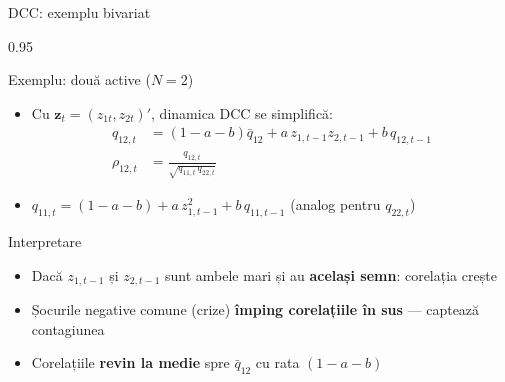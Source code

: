 \documentclass[9pt, aspectratio=169, t]{beamer}
\begin{document}
\begin{frame}{DCC: exemplu bivariat}
    \begin{cminipage}{0.95\textwidth}
    {\footnotesize
    \begin{exampleblock}{Exemplu: două active ($N=2$)}
        \begin{itemize}\setlength{\itemsep}{0pt}
            \item Cu $\mathbf{z}_t = (z_{1t}, z_{2t})'$, dinamica DCC se simplifică:
            \begin{align}
                q_{12,t} &= (1-a-b)\bar{q}_{12} + a\,z_{1,t-1}z_{2,t-1} + b\,q_{12,t-1} \\
                \rho_{12,t} &= \frac{q_{12,t}}{\sqrt{q_{11,t}\,q_{22,t}}}
            \end{align}
            \item $q_{11,t} = (1-a-b) + a\,z_{1,t-1}^2 + b\,q_{11,t-1}$ (analog pentru $q_{22,t}$)
        \end{itemize}
    \end{exampleblock}
    \begin{block}{Interpretare}
        \begin{itemize}\setlength{\itemsep}{0pt}
            \item Dacă $z_{1,t-1}$ și $z_{2,t-1}$ sunt ambele mari și au \textbf{același semn}: corelația crește
            \item Șocurile negative comune (crize) \textbf{împing corelațiile în sus} --- captează contagiunea
            \item Corelațiile \textbf{revin la medie} spre $\bar{q}_{12}$ cu rata $(1-a-b)$
        \end{itemize}
    \end{block}
    }
    \end{cminipage}
\end{frame}
\end{document}
